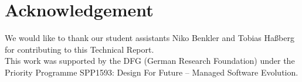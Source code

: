 \chapter*{Acknowledgement}
We would like to thank our student assistants Niko Benkler and Tobias Ha\ss berg
for contributing to this Technical Report.\\
This work was supported by the DFG (German Research Foundation) under the Priority
Programme SPP1593: Design For Future – Managed Software Evolution.